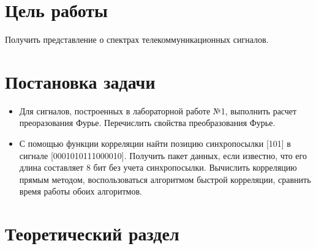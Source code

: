 \documentclass[a4paper]{article}
\begin{document}
\vfill %

\section{Цель работы}
Получить представление о спектрах телекоммуникационных сигналов.

\section{Постановка задачи}
\begin{itemize}
	\item Для сигналов, построенных в лабораторной работе №1, выполнить расчет преоразования Фурье. Перечислить свойства преобразования Фурье.
	\item С помощью функции корреляции найти позицию синхропосылки [101] в сигнале [0001010111000010]. Получить пакет данных, если известно, что его длина составляет 8 бит без
	учета синхропосылки. Вычислить корреляцию прямым методом, воспользоваться алгоритмом быстрой корреляции, сравнить время работы обоих алгоритмов.
\end{itemize}

\section{Теоретический раздел}
\end{document}
